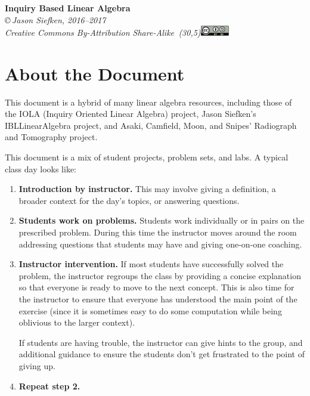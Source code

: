 \documentclass[14pt]{problemset}
\begin{document}
\pagestyle{empty}

\begin{center}
{\huge\bf Inquiry Based Linear Algebra}\\

\vspace{.7in}
{
\it \copyright\,Jason Siefken, 2016--2017 \\
Creative Commons By-Attribution Share-Alike\, \makebox(30,5){\includegraphics[height=1.2em]{by-sa.pdf}}
}
\end{center}

\section*{About the Document}

	This document is a hybrid of many linear algebra resources, including those of
	the IOLA (Inquiry Oriented Linear Algebra) project, Jason Siefken's IBLLinearAlgebra
	project, and Asaki, Camfield, Moon, and Snipes' Radiograph and Tomography project.

	This document is a mix of student projects, problem sets, and labs.
	A typical class day looks like:
	\begin{enumerate}
		\item {\bf Introduction by instructor.} This may involve giving a definition,
			a broader context for the day's topics, or answering questions.
		\item {\bf Students work on problems.} Students work individually or in pairs
			on the prescribed problem.  During this time the instructor moves around
			the room addressing questions that students may have and giving one-on-one
			coaching.
		\item {\bf Instructor intervention.} If most students have successfully solved the 
			problem, the instructor regroups the class by providing a concise 
			explanation so that everyone is ready to move to the next concept.  This
			is also time for the instructor to ensure that everyone has understood the
			main point of the exercise (since it is sometimes easy to do some computation
			while being oblivious to the larger context).

			If students are having trouble, the instructor can give hints to the group,
			and additional guidance to ensure the students don't get frustrated
			to the point of giving up.
		\item {\bf Repeat step 2.}
	\end{enumerate}
\end{document}
